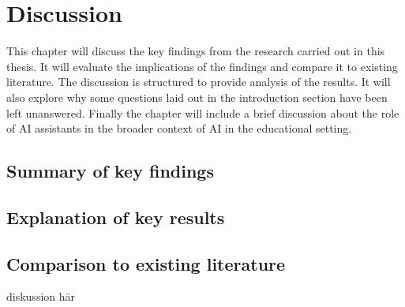 ﻿\chapter{Discussion}
\label{ch:discussion}


This chapter will discuss the key findings from the research carried out in this thesis. It will evaluate the implications of the findings and compare it to existing literature. The discussion is structured to provide analysis of the results. It will also explore why some questions laid out in the introduction section have been left unanswered. Finally the chapter will include a brief discussion about the role of AI assistants in the broader context of AI in the educational setting.


\section{Summary of key findings}




\section{Explanation of key results}








\section{Comparison to existing literature}


%






diskussion här


\cleardoublepage